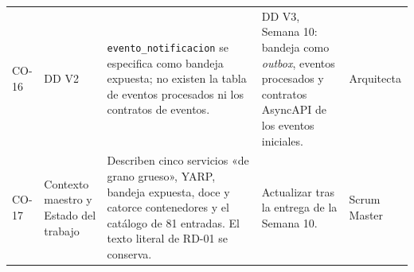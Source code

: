 \documentclass[11pt,a4paper]{article}
\begin{document}
\begin{longtable}{L{0.9cm} L{2.1cm} L{5.0cm} L{3.85cm} L{2.0cm}}
CO-16 & DD V2 & \texttt{evento\_\allowbreak notificacion} se especifica como bandeja expuesta; no existen la tabla de eventos procesados ni los contratos de eventos. & DD V3, Semana 10: bandeja como \emph{outbox}, eventos procesados y contratos AsyncAPI de los eventos iniciales. & Arquitecta \\
CO-17 & Contexto maestro y Estado del trabajo & Describen cinco servicios «de grano grueso», YARP, bandeja expuesta, doce y catorce contenedores y el catálogo de 81 entradas. El texto literal de RD-01 se conserva. & Actualizar tras la entrega de la Semana 10. & Scrum Master \\
\end{longtable}
\endgroup

\vspace{0.4cm}
\noindent{\footnotesize\textcolor{grisTexto}{Este documento describe el instrumental de un sistema académico que opera exclusivamente sobre datos sintéticos. Las versiones y fechas de soporte de terceros se verificaron el 6 de octubre de 2026 y se revisan en cada cierre de sprint.}}
\end{document}
